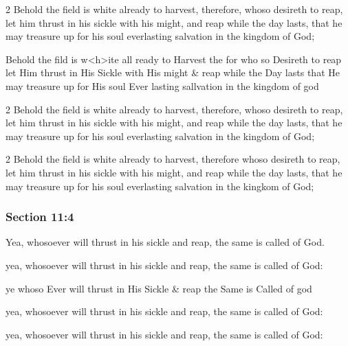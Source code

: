 		\begin{framed}
		\scriptsize
			\begin{compactdesc}
				\item[JSP] 2 Behold the field is white already to harvest, therefore, whoso desireth to reap, let him thrust in his sickle with his might, and reap while the day lasts, that he may treasure up for his soul everlasting salvation in the kingdom of God;
				\item[HS] Behold the fild is w<h>ite all ready to Harvest the for who so Desireth to reap let Him thrust in His Sickle with His might \& reap while the Day lasts that He may treasure up for His soul Ever lasting sallvation in the kingdom of god
				\item[DC 1835] 2 Behold the field is white already to harvest, therefore, whoso desireth to reap, let him thrust in his sickle with his might, and reap while the day lasts, that he may treasure up for his soul everlasting salvation in the kingdom of God; 
				\item[DC 1844] 2 Behold the field is white already to harvest, therefore whoso desireth to reap, let him thrust in his sickle with his might, and reap while the day lasts, that he may treasure up for his soul everlasting salvation in the kingkom of God; 
			\end{compactdesc}
		\end{framed}

	\subsubsection{Section 11:4} %
		\label{DC11-4}

		Yea, whosoever will thrust in his sickle and reap, the same is called of God.

		\begin{framed}
		\scriptsize
			\begin{compactdesc}
				\item[JSP] yea, whosoever will thrust in his sickle and reap, the same is called of God: 
				\item[HS] ye whoso Ever will thrust in His Sickle \& reap the Same is Called of god 
				\item[DC 1835] yea, whosoever will thrust in his sickle and reap, the same is called of God: 
				\item[DC 1844] yea, whosoever will thrust in his sickle and reap, the same is called of God: 
			\end{compactdesc}
		\end{framed}

